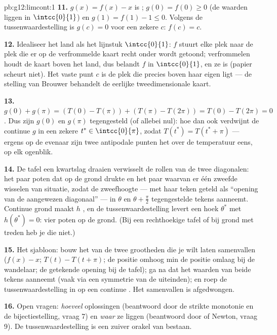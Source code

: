 \begin{solution}{pb:g12:limcont:1}
\textbf{11.} $g(x) = f(x) - x$ is ; $g(0) = f(0) \geq 0$ (de waarden
liggen in $\intcc{0}{1}$) en $g(1) = f(1) - 1 \leq 0$. Volgens de
tussenwaardestelling is $g(c) = 0$ voor een zekere $c$: $f(c) = c$.

\textbf{12.} Idealiseer het land als het lijnstuk $\intcc{0}{1}$: $f$ stuurt
elke plek naar de plek die er op de verfrommelde kaart recht onder wordt
getoond; verfrommelen houdt de kaart boven het land, dus belandt $f$ in
$\intcc{0}{1}$, en ze is  (papier scheurt niet). Het vaste punt $c$ is
de plek die precies boven haar eigen  ligt --- de stelling van Brouwer
behandelt de eerlijke tweedimensionale kaart.

\textbf{13.} $g(0) + g(\pi) = \left(T(0) - T(\pi)\right) +
\left(T(\pi) - T(2\pi)\right) = T(0) - T(2\pi) = 0$. Dus zijn $g(0)$ en
$g(\pi)$ tegengesteld (of allebei nul): hoe dan ook verdwijnt de continue $g$
in een zekere $t^* \in \intcc{0}{\pi}$, zodat $T(t^*) = T(t^* + \pi)$ ---
ergens op de evenaar zijn twee antipodale punten het over de temperatuur
eens, op elk ogenblik.

\textbf{14.} De tafel een kwartslag draaien verwisselt de rollen van de twee
diagonalen: het paar poten dat op de grond drukte en het paar waarvan er één
zweefde wisselen van situatie, zodat de zweefhoogte --- met haar teken geteld
als ``opening van de aangewezen diagonaal'' --- in $\theta$ en
$\theta + \frac\pi2$ tegengestelde tekens aanneemt. Continue grond maakt $h$
, en de tussenwaardestelling levert een hoek $\theta^*$ met
$h(\theta^*) = 0$: vier poten op de grond. (Bij een rechthoekige tafel of bij
grond met treden heb je die  niet.)

\textbf{15.} Het sjabloon: bouw het \emph{} van de twee grootheden
die je wilt laten samenvallen ($f(x) - x$; $T(t) - T(t + \pi)$; de positie
omhoog min de positie omlaag bij de wandelaar; de getekende opening bij de
tafel); ga na dat het waarden van beide tekens aanneemt (vaak via een
symmetrie van de uiteinden); en roep de tussenwaardestelling in op een
continue . Het samenvallen is afgedwongen.

\textbf{16.} Open vragen: \emph{hoeveel} oplossingen (beantwoord door de
strikte monotonie en de bijectiestelling, vraag 7) en \emph{waar} ze liggen
(beantwoord door  of Newton, vraag 9). De tussenwaardestelling is een
zuiver orakel van bestaan.


\end{solution}
